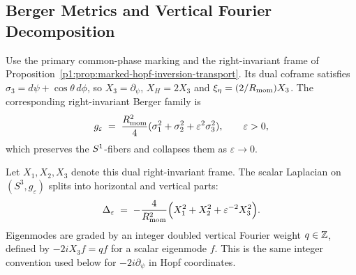 \documentclass[11pt]{article}
\begin{document}
\subsection{Berger Metrics and Vertical Fourier Decomposition}
\label{p1:sec:berger}

Use the primary common-phase marking and the right-invariant frame of
Proposition~\ref{p1:prop:marked-hopf-inversion-transport}.  Its dual coframe
satisfies $\sigma_3=d\psi+\cos\theta\,d\phi$, so $X_3=\partial_\psi$,
$X_H=2X_3$ and $\xi_\eta=(2/R_{\mathrm{mom}})X_3$.  The corresponding
right-invariant Berger family is
\begin{equation}
g_\varepsilon \;=\; \frac{R_{\mathrm{mom}}^2}{4}(\sigma_1^2+\sigma_2^2+\varepsilon^2\sigma_3^2),
\qquad \varepsilon>0,
\end{equation}
which preserves the $S^1$-fibers and collapses them as $\varepsilon\to0$.

Let $X_1,X_2,X_3$ denote this dual right-invariant frame.
The scalar Laplacian on $(S^3,g_\varepsilon)$ splits into horizontal and vertical parts:
\begin{equation}
\Delta_\varepsilon \;=\; -\frac{4}{R_{\mathrm{mom}}^2}\Big(X_1^2+X_2^2+\varepsilon^{-2}X_3^2\Big).
\end{equation}
Eigenmodes are graded by an integer doubled vertical Fourier weight \(q\in\mathbb{Z}\), defined by \(-2iX_3 f=qf\) for a scalar eigenmode \(f\). This is the same integer convention used below for \(-2i\partial_\psi\) in Hopf coordinates.
\end{document}
